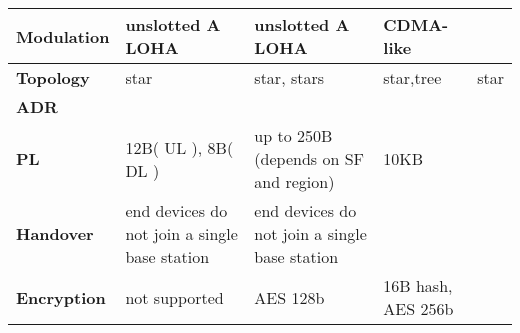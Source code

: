 \begin{table}[h!]
\begin{tabulary}{\textwidth}{L|L|L|L|L}
	\textbf{Modulation}                          & unslotted A LOHA                              & unslotted A LOHA                                              & CDMA-like                                       & \\\hline                                                                       
	\textbf{Topology}                            & star                                          & star, stars                                                   & star,tree                                       & star \\\hline                                                                  
	\textbf{\ac{ADR}}                            & \ko                                           & \ok                                                           & \ok                                             & \ko \\\hline                                                                   
	\textbf{\ac{PL}}                             & 12B( UL ), 8B( DL )                           & up to 250B (depends on SF and region)                         & 10KB                                            & \\\hline
	\textbf{Handover}                            & end devices do not join a single base station & end devices do not join a single base station                 &                                                 & \\\hline                                                                       
	\textbf{Encryption}                          & not supported                                 & AES 128b                                                      & 16B hash, AES 256b                              & \\\hline                                                                       
	\end{tabulary}
\caption{\label{tab:edesf} \cite{raza_low_22}}
\end{table}


